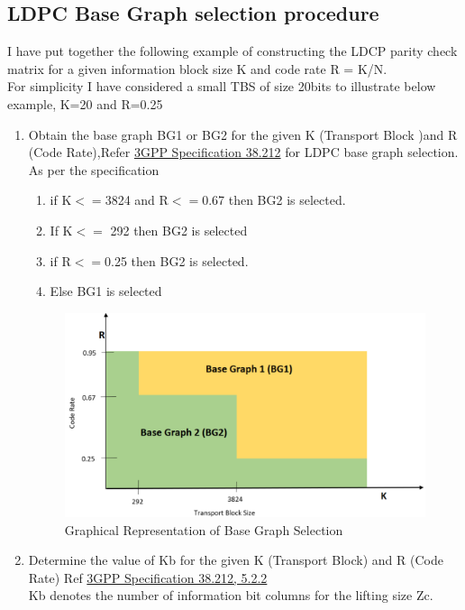\documentclass[journal,twocolumn]{IEEEtran}
\begin{document}
{{ \subsection{\textbf{LDPC Base Graph selection procedure}}   
   I have put together the following example of constructing the LDCP parity check matrix for a given information block size K and code rate R = K/N.\\
For simplicity I have considered a small TBS of size 20bits to illustrate below example, K=20 and R=0.25   
\begin{enumerate}
  \item Obtain the base graph BG1 or BG2 for the given K (Transport Block )and R (Code Rate),Refer {\href{https://www.etsi.org/deliver/etsi_ts/138200_138299/138212/17.01.00_60/ts_138212v170100p.pdf}{3GPP Specification 38.212}} for LDPC base graph selection. \\
As per the specification\\
\begin{enumerate}
 \item if K$<=$3824 and R$<=$0.67 then BG2 is selected.\\
 \item    If K$<=$ 292 then BG2 is selected\\
 \item    if R$<=$0.25 then BG2 is selected.\\
 \item    Else BG1 is selected\\
 \end{enumerate}
   \begin{figure}[h]
 \includegraphics[width=\columnwidth]{../figs/bgs-sel.png} 
  \caption{Graphical Representation of Base Graph Selection}
  \end{figure}
    \item  Determine the value of Kb for the given K (Transport Block) and R (Code Rate) Ref {\href{https://www.etsi.org/deliver/etsi_ts/138200_138299/138212/17.01.00_60/ts_138212v170100p.pdf}{3GPP Specification 38.212, 5.2.2}}\\
    Kb denotes the number of information bit columns for the lifting size Zc.\\


\end{enumerate}}}
\end{document}
